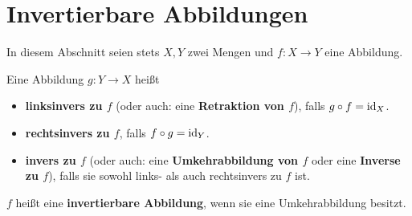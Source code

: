 \section{Invertierbare Abbildungen}


In diesem Abschnitt seien stets $X,Y$ zwei Mengen und $f:X\to Y$ eine Abbildung.


\begin{defin}[Umkehrabbildung] \label{def:umkehrabb}    
    Eine Abbildung $g:Y \to X$ heißt 
    \begin{itemize}
        \item \textbf{linksinvers zu $f$} (oder auch: eine \textbf{Retraktion von $f$}), falls $g\circ f=\mathrm{id}_X$.
        \item \textbf{rechtsinvers zu $f$}, falls $f\circ g=\mathrm{id}_Y$.
        \item \textbf{invers zu $f$} (oder auch: eine \textbf{Umkehrabbildung von $f$} oder eine \textbf{Inverse zu $f$}), falls sie sowohl links- als auch rechtsinvers zu $f$ ist.
    \end{itemize}
    $f$ heißt eine \textbf{invertierbare Abbildung}, wenn sie eine Umkehrabbildung besitzt.
\end{defin}


